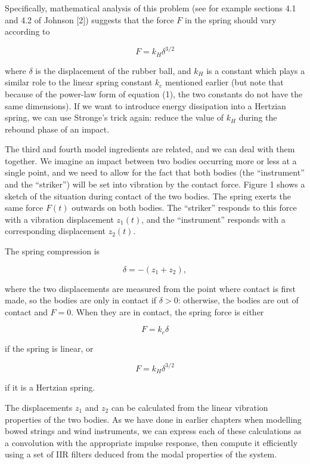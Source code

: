   Specifically, mathematical analysis of this problem (see for example sections 
  4.1 and 4.2 of Johnson [2]) suggests that the force $F$ in the spring should 
  vary according to 

  $$F=k_H \delta^{3/2} \tag{1}$$ 

  where $\delta$ is the displacement of the rubber ball, and $k_H$ is a 
  constant which plays a similar role to the linear spring constant $k_c$ 
  mentioned earlier (but note that because of the power-law form of equation 
  (1), the two constants do not have the same dimensions). If we want to 
  introduce energy dissipation into a Hertzian spring, we can use Stronge's 
  trick again: reduce the value of $k_H$ during the rebound phase of an impact. 

  The third and fourth model ingredients are related, and we can deal with them 
  together. We imagine an impact between two bodies occurring more or less at a 
  single point, and we need to allow for the fact that both bodies (the 
  ``instrument'' and the ``striker'') will be set into vibration by the contact 
  force. Figure 1 shows a sketch of the situation during contact of the two 
  bodies. The spring exerts the same force $F(t)$ outwards on both bodies. The 
  ``striker'' responds to this force with a vibration displacement $z_1(t)$, 
  and the ``instrument'' responds with a corresponding displacement $z_2(t)$. 


  The spring compression is 

  $$\delta=-(z_1+z_2), \tag{2}$$ 

  where the two displacements are measured from the point where contact is 
  first made, so the bodies are only in contact if $\delta > 0$: otherwise, the 
  bodies are out of contact and $F=0$. When they are in contact, the spring 
  force is either 

  $$F=k_c\delta \tag{3}$$ 

  if the spring is linear, or 

  $$F=k_H\delta^{3/2} \tag{4}$$ 

  if it is a Hertzian spring. 

  The displacements $z_1$ and $z_2$ can be calculated from the linear vibration 
  properties of the two bodies. As we have done in earlier chapters when 
  modelling bowed strings and wind instruments, we can express each of these 
  calculations as a convolution with the appropriate impulse response, then 
  compute it efficiently using a set of IIR filters deduced from the modal 
  properties of the system. 

